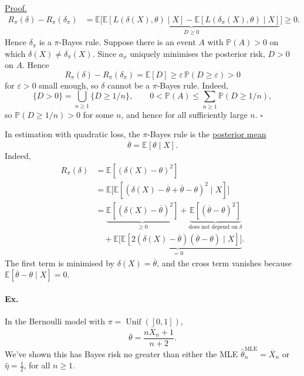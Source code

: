 \documentclass[11pt,a4paper]{article}
\begin{document}
\medskip
\noindent\underline{Proof.}\quad
\[
\begin{aligned}
R_\pi(\delta)-R_\pi(\delta_\pi)
&=\mathbb E\bigl[
\underbrace{\mathbb E[L(\delta(X),\theta)\mid X]
-\mathbb E[L(\delta_\pi(X),\theta)\mid X]}_{D\geq0}
\bigr]\geq0.
\end{aligned}
\]
Hence $\delta_\pi$ is a $\pi$-Bayes rule.
Suppose there is an event $A$ with $\mathbb P(A)>0$ on which
$\delta(X)\ne\delta_\pi(X)$. Since $a_x$ uniquely minimises the posterior
risk, $D>0$ on $A$. Hence
\[
R_\pi(\delta)-R_\pi(\delta_\pi)=\mathbb E[D]
\geq\varepsilon\,\mathbb P(D\geq\varepsilon)>0
\]
for $\varepsilon>0$ small enough, so $\delta$ cannot be a $\pi$-Bayes rule.
Indeed,
\[
\{D>0\}=\bigcup_{n\geq1}\{D\geq1/n\},\qquad
0<\mathbb P(A)\leq\sum_{n\geq1}\mathbb P(D\geq1/n),
\]
so $\mathbb P(D\geq1/n)>0$ for some $n$, and hence for all sufficiently
large $n$. \hfill$\square$

\medskip
In estimation with quadratic loss, the $\pi$-Bayes rule is the
\underline{posterior mean}
\[
\overline\theta=\mathbb E[\theta\mid X].
\]
Indeed,
\[
\begin{aligned}
R_\pi(\delta)
&=\mathbb E[(\delta(X)-\theta)^2]\\
&=\mathbb E\bigl[\mathbb E[
(\delta(X)-\overline\theta+\overline\theta-\theta)^2\mid X]\bigr]\\
&=\underbrace{\mathbb E[(\delta(X)-\overline\theta)^2]}_{\geq0}
+\underbrace{\mathbb E[(\overline\theta-\theta)^2]}_{\text{does not depend on }\delta}\\
&\quad+\underbrace{\mathbb E\bigl[\mathbb E[
2(\delta(X)-\overline\theta)(\overline\theta-\theta)\mid X]\bigr]}_{=0}.
\end{aligned}
\]
The first term is minimised by $\delta(X)=\overline\theta$, and the cross
term vanishes because $\mathbb E[\overline\theta-\theta\mid X]=0$.

\paragraph{Ex.}
In the Bernoulli model with $\pi=\operatorname{Unif}([0,1])$,
\[
\overline\theta=\frac{n\overline X_n+1}{n+2}.
\]
We've shown this has Bayes risk no greater than either the MLE
$\hat\theta_n^{\mathrm{MLE}}=\overline X_n$ or $\hat\eta=\frac12$,
for all $n\geq1$.
\end{document}
